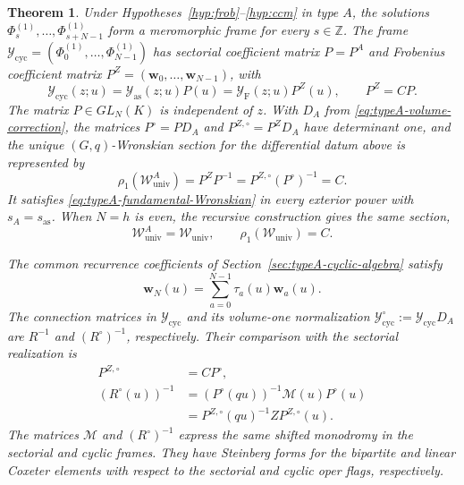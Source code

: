 \documentclass[11pt,leqno]{amsart}
\numberwithin{equation}{section}
\theoremstyle{plain}
\newtheorem{theorem}{Theorem}[section]
\theoremstyle{definition}
\theoremstyle{plain}
\theoremstyle{definition}
\theoremstyle{remark}
\begin{document}
\begin{theorem}\label{thm:typeA-universal-realization}
Under Hypotheses~\ref{hyp:frob}--\ref{hyp:ccm} in type $A$, the solutions $\Phi_s^{(1)},\ldots,\Phi_{s+N-1}^{(1)}$ form a meromorphic frame for every $s\in\mathbb Z$. The frame $\mathcal Y_{\mathrm{cyc}}=(\Phi_0^{(1)},\ldots,\Phi_{N-1}^{(1)})$ has sectorial coefficient matrix $P=P^A$ and Frobenius coefficient matrix $P^Z=(\mathbf w_0,\ldots,\mathbf w_{N-1})$, with
\begin{equation}\label{eq:typeA-analytic-frame-transition}
 \mathcal Y_{\mathrm{cyc}}(z;u)
 =\mathcal Y_{\mathrm{as}}(z;u)P(u)
 =\mathcal Y_{\mathrm F}(z;u)P^Z(u),
 \qquad P^Z=CP.
\end{equation}
The matrix $P\in GL_N(K)$ is independent of $z$. With $D_A$ from \eqref{eq:typeA-volume-correction}, the matrices $P^\circ=PD_A$ and $P^{Z,\circ}=P^ZD_A$ have determinant one, and the unique $(G,q)$-Wronskian section for the differential datum above is represented by
\begin{equation}\label{eq:typeA-universal-reference-comparison}
 \rho_1(\mathscr W_{\mathrm{univ}}^A)
 =P^ZP^{-1}
 =P^{Z,\circ}(P^\circ)^{-1}
 =C.
\end{equation}
It satisfies \eqref{eq:typeA-fundamental-Wronskian} in every exterior power with $s_A=s_{\mathrm{as}}$. When $N=h$ is even, the recursive construction gives the same section,
\[
 \mathscr W_{\mathrm{univ}}^A=\mathscr W_{\mathrm{univ}},
 \qquad \rho_1(\mathscr W_{\mathrm{univ}})=C.
\]

The common recurrence coefficients of Section~\ref{sec:typeA-cyclic-algebra} satisfy
\begin{equation}\label{eq:typeA-recurrence}
 \mathbf w_N(u)=\sum_{a=0}^{N-1}\tau_a(u)\mathbf w_a(u).
\end{equation}
The connection matrices in $\mathcal Y_{\mathrm{cyc}}$ and its volume-one normalization $\mathcal Y_{\mathrm{cyc}}^\circ:=\mathcal Y_{\mathrm{cyc}}D_A$ are $R^{-1}$ and $(R^\circ)^{-1}$, respectively. Their comparison with the sectorial realization is
\begin{equation}\label{eq:typeA-differential-Steinberg-comparison}
 \begin{aligned}
 P^{Z,\circ}&=CP^\circ,\\
 (R^\circ(u))^{-1}
 &=(P^\circ(qu))^{-1}\mathscr M(u)P^\circ(u)\\
 &=P^{Z,\circ}(qu)^{-1}ZP^{Z,\circ}(u).
 \end{aligned}
\end{equation}
The matrices $\mathscr M$ and $(R^\circ)^{-1}$ express the same shifted monodromy in the sectorial and cyclic frames. They have Steinberg forms for the bipartite and linear Coxeter elements with respect to the sectorial and cyclic oper flags, respectively.
\end{theorem}
\end{document}
